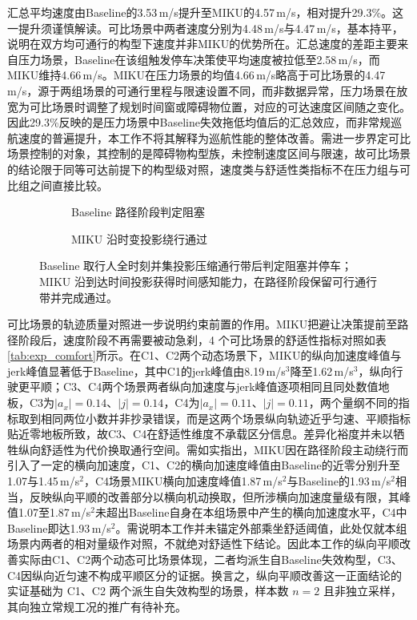 \documentclass[a4paper,11pt]{ctexart}
\providecommand{\datapath}{../../图片/data/01_crossing_ped/}
\theoremstyle{definition}
\begin{document}
汇总平均速度由Baseline的3.53\,m/s提升至MIKU的4.57\,m/s，相对提升29.3\%。这一提升须谨慎解读。可比场景中两者速度分别为4.48\,m/s与4.47\,m/s，基本持平，说明在双方均可通行的构型下速度并非MIKU的优势所在。汇总速度的差距主要来自压力场景，Baseline在该组触发停车决策使平均速度被拉低至2.58\,m/s，而MIKU维持4.66\,m/s。MIKU在压力场景的均值4.66\,m/s略高于可比场景的4.47\,m/s，源于两组场景的可通行里程与限速设置不同，而非数据异常，压力场景在放宽为可比场景时调整了规划时间窗或障碍物位置，对应的可达速度区间随之变化。因此29.3\%反映的是压力场景中Baseline失效拖低均值后的汇总效应，而非常规巡航速度的普遍提升，本工作不将其解释为巡航性能的整体改善。需进一步界定可比场景控制的对象，其控制的是障碍物构型族，未控制速度区间与限速，故可比场景的结论限于同等可达前提下的构型级对照，速度类与舒适性类指标不在压力组与可比组之间直接比较。

\begin{figure}[htbp]
\centering
\begingroup
\renewcommand{\datapath}{../../图片/data/01_crossing_ped/}
\begin{subfigure}[b]{0.46\textwidth}
  \centering
  \caption{Baseline 路径阶段判定阻塞}
\end{subfigure}\hfill
\begin{subfigure}[b]{0.46\textwidth}
  \centering
  \caption{MIKU 沿时变投影绕行通过}
\end{subfigure}
\endgroup
\caption{压力场景 P1 单行人横穿的 SL 路径边界对照}
\caption*{Baseline 取行人全时刻并集投影压缩通行带后判定阻塞并停车；MIKU 沿到达时间投影获得时间感知能力，在路径阶段保留可行通行带并完成通过。}
\label{fig:exp_p1_sl}
\end{figure}

可比场景的轨迹质量对照进一步说明约束前置的作用。MIKU把避让决策提前至路径阶段后，速度阶段不再需要被动急刹，4 个可比场景的舒适性指标对照如表\ref{tab:exp_comfort}所示。在C1、C2两个动态场景下，MIKU的纵向加速度峰值与jerk峰值显著低于Baseline，其中C1的jerk峰值由8.19\,m/s$^3$降至1.62\,m/s$^3$，纵向行驶更平顺；C3、C4两个场景两者纵向加速度与jerk峰值逐项相同且同处数值地板，C3为$|a_x|=0.14$、$|j|=0.14$，C4为$|a_x|=0.11$、$|j|=0.11$，两个量纲不同的指标取到相同两位小数并非抄录错误，而是这两个场景纵向轨迹近乎匀速、平顺指标贴近零地板所致，故C3、C4在舒适性维度不承载区分信息。差异化裕度并未以牺牲纵向舒适性为代价换取通行空间。需如实指出，MIKU因在路径阶段主动绕行而引入了一定的横向加速度，C1、C2的横向加速度峰值由Baseline的近零分别升至1.07与1.45\,m/s$^2$，C4场景MIKU横向加速度峰值1.87\,m/s$^2$与Baseline的1.93\,m/s$^2$相当，反映纵向平顺的改善部分以横向机动换取，但所涉横向加速度量级有限，其峰值1.07至1.87\,m/s$^2$未超出Baseline自身在本组场景中产生的横向加速度水平，C4中Baseline即达1.93\,m/s$^2$。需说明本工作并未锚定外部乘坐舒适阈值，此处仅就本组场景内两者的相对量级作对照，不就绝对舒适性下结论。因此本工作的纵向平顺改善实际由C1、C2两个动态可比场景体现，二者均派生自Baseline失效构型，C3、C4因纵向近匀速不构成平顺区分的证据。换言之，纵向平顺改善这一正面结论的实证基础为 C1、C2 两个派生自失效构型的场景，样本数 $n=2$ 且非独立采样，其向独立常规工况的推广有待补充。
\end{document}
